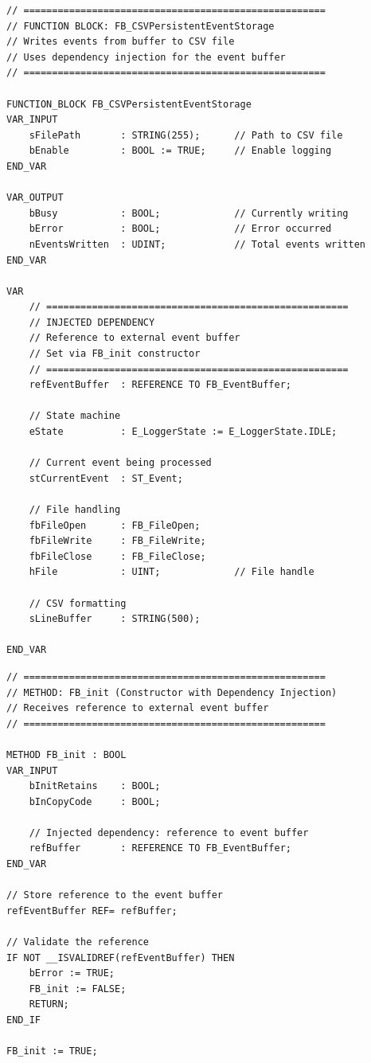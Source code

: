 \documentclass[11pt,a4paper]{article}
\begin{document}
\begin{lstlisting}
// =====================================================
// FUNCTION BLOCK: FB_CSVPersistentEventStorage
// Writes events from buffer to CSV file
// Uses dependency injection for the event buffer
// =====================================================

FUNCTION_BLOCK FB_CSVPersistentEventStorage
VAR_INPUT
    sFilePath       : STRING(255);      // Path to CSV file
    bEnable         : BOOL := TRUE;     // Enable logging
END_VAR

VAR_OUTPUT
    bBusy           : BOOL;             // Currently writing
    bError          : BOOL;             // Error occurred
    nEventsWritten  : UDINT;            // Total events written
END_VAR

VAR
    // =====================================================
    // INJECTED DEPENDENCY
    // Reference to external event buffer
    // Set via FB_init constructor
    // =====================================================
    refEventBuffer  : REFERENCE TO FB_EventBuffer;
    
    // State machine
    eState          : E_LoggerState := E_LoggerState.IDLE;
    
    // Current event being processed
    stCurrentEvent  : ST_Event;
    
    // File handling
    fbFileOpen      : FB_FileOpen;
    fbFileWrite     : FB_FileWrite;
    fbFileClose     : FB_FileClose;
    hFile           : UINT;             // File handle
    
    // CSV formatting
    sLineBuffer     : STRING(500);
    
END_VAR
\end{lstlisting}

\begin{lstlisting}
// =====================================================
// METHOD: FB_init (Constructor with Dependency Injection)
// Receives reference to external event buffer
// =====================================================

METHOD FB_init : BOOL
VAR_INPUT
    bInitRetains    : BOOL;
    bInCopyCode     : BOOL;
    
    // Injected dependency: reference to event buffer
    refBuffer       : REFERENCE TO FB_EventBuffer;
END_VAR

// Store reference to the event buffer
refEventBuffer REF= refBuffer;

// Validate the reference
IF NOT __ISVALIDREF(refEventBuffer) THEN
    bError := TRUE;
    FB_init := FALSE;
    RETURN;
END_IF

FB_init := TRUE;
\end{lstlisting}
\end{document}
